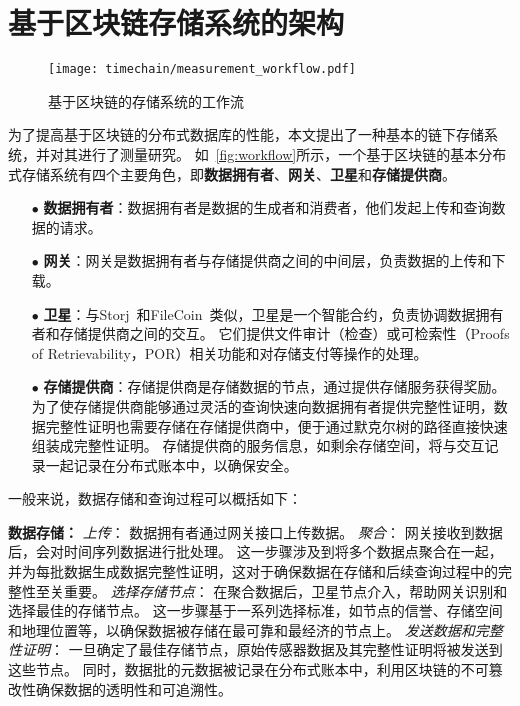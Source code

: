 \section{基于区块链存储系统的架构}

\begin{figure}[t]
    \centering
    \texttt{[image: timechain/measurement\_workflow.pdf]}
    \caption{基于区块链的存储系统的工作流}
    \label{fig:workflow}
\end{figure}

为了提高基于区块链的分布式数据库的性能，本文提出了一种基本的链下存储系统，并对其进行了测量研究。
如~\autoref{fig:workflow}所示，一个基于区块链的基本分布式存储系统有四个主要角色，即\textbf{数据拥有者}、\textbf{网关}、\textbf{卫星}和\textbf{存储提供商}。

\begin{itemize}
    \item[$\bullet$] \textbf{数据拥有者}：数据拥有者是数据的生成者和消费者，他们发起上传和查询数据的请求。
    \item[$\bullet$] \textbf{网关}：网关是数据拥有者与存储提供商之间的中间层，负责数据的上传和下载。
    \item[$\bullet$] \textbf{卫星}：与Storj~\cite{storj2018storj}和FileCoin~\cite{bauer2022filecoin}类似，卫星是一个智能合约，负责协调数据拥有者和存储提供商之间的交互。
    它们提供文件审计（检查）或可检索性（Proofs of Retrievability，POR）相关功能和对存储支付等操作的处理。
    \item[$\bullet$] \textbf{存储提供商}：存储提供商是存储数据的节点，通过提供存储服务获得奖励。
    为了使存储提供商能够通过灵活的查询快速向数据拥有者提供完整性证明，数据完整性证明也需要存储在存储提供商中，便于通过默克尔树的路径直接快速组装成完整性证明。
    存储提供商的服务信息，如剩余存储空间，将与交互记录一起记录在分布式账本中，以确保安全。
\end{itemize}

一般来说，数据存储和查询过程可以概括如下：

\textbf{数据存储：}
\textit{上传}：
数据拥有者通过网关接口上传数据。
\textit{聚合}：
网关接收到数据后，会对时间序列数据进行批处理。
这一步骤涉及到将多个数据点聚合在一起，并为每批数据生成数据完整性证明，这对于确保数据在存储和后续查询过程中的完整性至关重要。
\textit{选择存储节点}：
在聚合数据后，卫星节点介入，帮助网关识别和选择最佳的存储节点。
这一步骤基于一系列选择标准，如节点的信誉、存储空间和地理位置等，以确保数据被存储在最可靠和最经济的节点上。
\textit{发送数据和完整性证明}：
一旦确定了最佳存储节点，原始传感器数据及其完整性证明将被发送到这些节点。
同时，数据批的元数据被记录在分布式账本中，利用区块链的不可篡改性确保数据的透明性和可追溯性。

